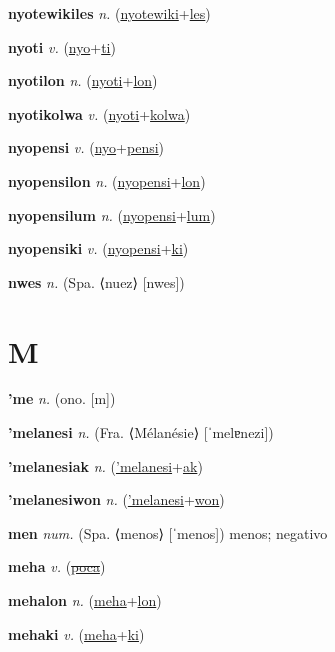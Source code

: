 \textbf{\hypertarget{nyotewikiles}{nyotewikiles}} \textit{n.} (\hyperlink{nyotewiki}{nyotewiki}+\allowbreak \hyperlink{les}{les})


\textbf{\hypertarget{nyoti}{nyoti}} \textit{v.} (\hyperlink{nyo}{nyo}+\allowbreak \hyperlink{ti}{ti})


\textbf{\hypertarget{nyotilon}{nyotilon}} \textit{n.} (\hyperlink{nyoti}{nyoti}+\allowbreak \hyperlink{lon}{lon})


\textbf{\hypertarget{nyotikolwa}{nyotikolwa}} \textit{v.} (\hyperlink{nyoti}{nyoti}+\allowbreak \hyperlink{kolwa}{kolwa})


\textbf{\hypertarget{nyopensi}{nyopensi}} \textit{v.} (\hyperlink{nyo}{nyo}+\allowbreak \hyperlink{pensi}{pensi})


\textbf{\hypertarget{nyopensilon}{nyopensilon}} \textit{n.} (\hyperlink{nyopensi}{nyopensi}+\allowbreak \hyperlink{lon}{lon})


\textbf{\hypertarget{nyopensilum}{nyopensilum}} \textit{n.} (\hyperlink{nyopensi}{nyopensi}+\allowbreak \hyperlink{lum}{lum})


\textbf{\hypertarget{nyopensiki}{nyopensiki}} \textit{v.} (\hyperlink{nyopensi}{nyopensi}+\allowbreak \hyperlink{ki}{ki})


\textbf{\hypertarget{nwes}{nwes}} \textit{n.} (Spa. ⟨nuez⟩ [nwes])


\section{M}

\textbf{\hypertarget{'me}{'me}} \textit{n.} (ono. [m])


\textbf{\hypertarget{'melanesi}{'melanesi}} \textit{n.} (Fra. ⟨Mélanésie⟩ [ˈmelɐnezi])


\textbf{\hypertarget{'melanesiak}{'melanesiak}} \textit{n.} (\hyperlink{'melanesi}{'melanesi}+\allowbreak \hyperlink{ak}{ak})


\textbf{\hypertarget{'melanesiwon}{'melanesiwon}} \textit{n.} (\hyperlink{'melanesi}{'melanesi}+\allowbreak \hyperlink{won}{won})


\textbf{\hypertarget{men}{men}} \textit{num.} (Spa. ⟨menos⟩ [ˈmenos])
menos; negativo

\textbf{\hypertarget{meha}{meha}} \textit{v.} (\hyperlink{poca}{\sout{poca}})


\textbf{\hypertarget{mehalon}{mehalon}} \textit{n.} (\hyperlink{meha}{meha}+\allowbreak \hyperlink{lon}{lon})


\textbf{\hypertarget{mehaki}{mehaki}} \textit{v.} (\hyperlink{meha}{meha}+\allowbreak \hyperlink{ki}{ki})


